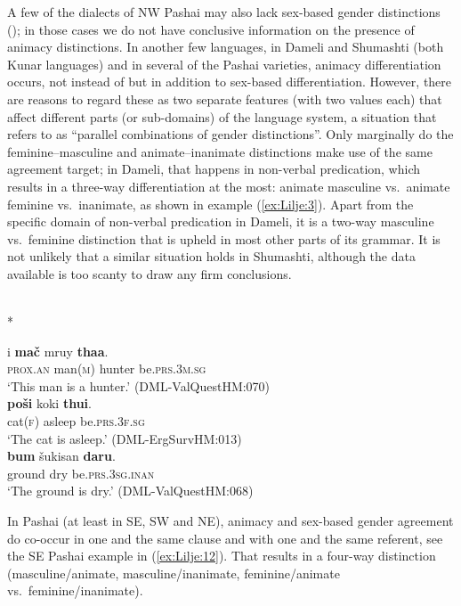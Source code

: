 \documentclass[output=collectionpaper]{langsci/langscibook}
\begin{document}
A few of the dialects of NW Pashai may also lack sex-based gender distinctions (\citealt[150--151]{Morgenstierne1967}); in those cases we do not have conclusive information on the presence of animacy distinctions. In another few languages, in Dameli and Shumashti (both Kunar languages) and in several of the Pashai varieties, animacy differentiation occurs, not instead of but in addition to sex-based differentiation. However, there are reasons to regard these as two separate features (with two values each) that affect different parts (or sub-domains) of the language system, a situation that \citet[581--582]{Dahl2000} refers to as ``parallel combinations of gender distinctions''. Only marginally do the feminine--masculine and animate--inanimate distinctions make use of the same agreement target; in Dameli, that happens in non-verbal predication, which results in a three-way differentiation at the most: animate masculine vs.\ animate feminine vs.\ inanimate, as shown in example (\ref{ex:Lilje:3}). Apart from the specific domain of non-verbal predication in Dameli, it is a two-way masculine vs.\ feminine distinction that is upheld in most other parts of its grammar. It is not unlikely that a similar situation holds in Shumashti, although the data available is too scanty to draw any firm conclusions.

\ea
\label{ex:Lilje:3}
\\*
\begin{xlist}
\ex
\gll i \textbf{mač} mruy \textbf{thaa}.    \\
\textsc{prox.an} man(\textsc{m}) hunter be\textsc{.prs.3m.sg}    \\
\glt `This man is a hunter.' (DML-ValQuestHM:070)\\
\ex
\gll \textbf{poši} koki \textbf{thui}.     \\
cat(\textsc{f}) asleep be.\textsc{prs.3f.sg}     \\
\glt `The cat is asleep.' (DML-ErgSurvHM:013)\\
\ex
\gll \textbf{bum} šukisan \textbf{daru}.     \\
ground dry be.\textsc{prs.3sg.inan}     \\
\glt `The ground is dry.' (DML-ValQuestHM:068)\\
\end{xlist}
\z

In Pashai (at least in SE, SW and NE), animacy and sex-based gender agreement do co-occur in one and the same clause and with one and the same referent, see the SE Pashai example in (\ref{ex:Lilje:12}). That results in a four-way distinction (masculine/animate, masculine/inanimate, feminine/animate vs.\ feminine/inanimate).
\end{document}
